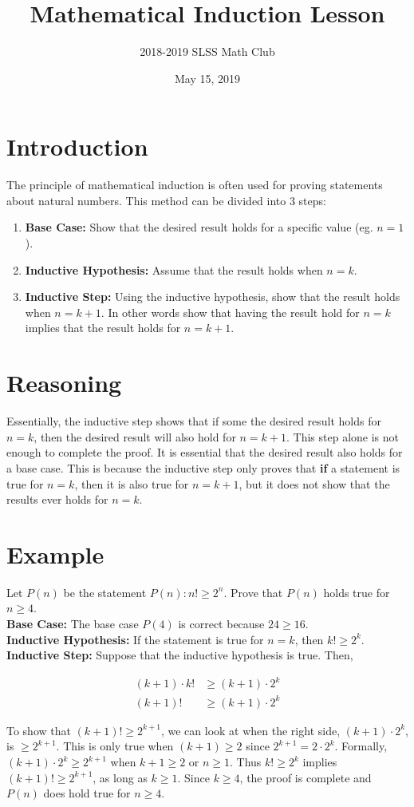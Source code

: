 \documentclass[12pt]{article}
\title{Mathematical Induction Lesson\vspace{-3mm}}
\author{2018-2019 SLSS Math Club\vspace{-5mm}}
\date{May 15, 2019\vspace{-5mm}}
\begin{document}
\maketitle

\section{Introduction}
The principle of mathematical induction is often used for proving statements about natural numbers. This method can be divided into 3 steps:
\begin{enumerate}
   \item \textbf{Base Case:} Show that the desired result holds for a specific value (eg. $n = 1$).
   \item \textbf{Inductive Hypothesis:} Assume that the result holds when $n = k$.
   \item \textbf{Inductive Step:} Using the inductive hypothesis, show that the result holds when $n = k + 1$. In other words show that having the result hold for $n = k$ implies that the result holds for $n = k + 1$.
\end{enumerate}

\section{Reasoning}
Essentially, the inductive step shows that if some the desired result holds for $n = k$, then the desired result will also hold for $n = k + 1$. This step alone is not enough to complete the proof. It is essential that the desired result also holds for a base case. This is because the inductive step only proves that \textbf{if} a statement is true for $n = k$, then it is also true for $n = k + 1$, but it does not show that the results ever holds for $n = k$.

\section{Example}
Let $P(n)$ be the statement $P(n): n! \ge 2^n$. Prove that $P(n)$ holds true for $n \ge 4$. \\

\textbf{Base Case:} The base case $P(4)$ is correct because $24 \ge 16$. \\

\textbf{Inductive Hypothesis:} If the statement is true for $n = k$, then $k! \ge 2^k$. \\

\textbf{Inductive Step:} Suppose that the inductive hypothesis is true. Then,

\begin{align*}
    (k+1) \cdot k! &\ge (k+1) \cdot 2^k \\
    (k+1)! &\ge (k+1) \cdot 2^k
\end{align*}

To show that $(k+1)! \ge 2^{k+1}$, we can look at when the right side, $(k+1) \cdot 2^k$, is $\ge 2^{k+1}$. This is only true when $(k+1) \ge 2$ since $2^{k+1} = 2 \cdot 2^k$. Formally, $(k+1) \cdot 2^k \ge 2^{k+1}$ when $k+1 \ge 2$ or $n \ge 1$. Thus $k! \ge 2^k$ implies $(k+1)! \ge 2^{k+1}$, as long as $k \ge 1$. Since $k \ge 4$, the proof is complete and $P(n)$ does hold true for $n \ge 4$.
\end{document}
